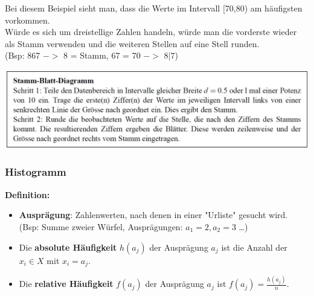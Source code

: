 \documentclass[12pt,a4paper]{article} %
\begin{document}
Bei diesem Beispiel sieht man, dass die Werte im Intervall [70,80) am häufigsten vorkommen.\\
Würde es sich um dreistellige Zahlen handeln, würde man die vorderste wieder als Stamm verwenden und die weiteren Stellen auf eine Stell  runden.\\(Bsp: 867 $->$ 8 = Stamm, 67 = 70 $->$ $8|7$)\\

\begin{center}
\includegraphics[scale=0.5]{beschStammBlatt.jpg}
\end{center}

\pagebreak

\subsubsection{Histogramm}
\textbf{Definition:}
\begin{itemize}
\item \textbf{Ausprägung}: Zahlenwerten, nach denen in einer "Urliste" gesucht wird. (Bsp: Summe zweier Würfel, Ausprägungen: $a_1 = 2, a_2 = 3$ \dots)
\item Die \textbf{absolute Häufigkeit} $h(a_j)$ der Ausprägung $a_j$ ist die Anzahl der $x_i \in X$ mit $x_i = a_j$.
\item Die \textbf{relative Häufigkeit} $f(a_j)$ der Ausprägung $a_j$ ist $f(a_j) = \frac{h(a_j)}{n}$.
\end{itemize}
\end{document}
